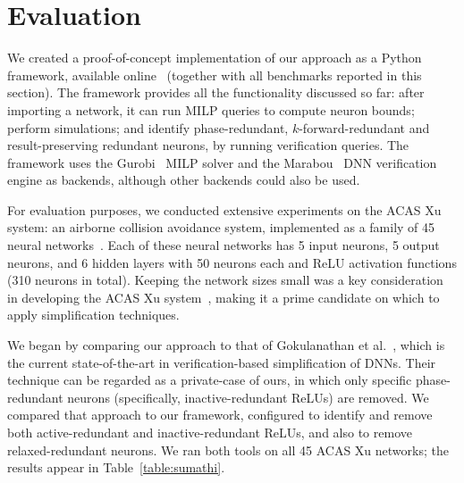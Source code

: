 \documentclass[10pt, conference, twocolumn, compsocconf]{IEEEtran}
\theoremstyle{remark}
\newcommand{\kfr}{$k$-forward-redundant}
\newcommand{\todo}[1]{{\color{red}{\textbf{[TODO]} #1}}}
\newcommand{\guy}[1]{\marginpar{\textcolor{orange}{Guy: #1}}}
\begin{document}







\section{Evaluation}
\label{sec:evaluation}
We created a proof-of-concept implementation of our approach as a
Python framework, available online~\cite{ourCode} (together with all
benchmarks reported in this section). The framework provides all the
functionality discussed so far: after importing a network, it can run
MILP queries to compute neuron bounds; perform simulations; and
identify phase-redundant, \kfr{} and result-preserving redundant
neurons, by running verification queries. The framework uses
the Gurobi~\cite{Gurobi} MILP solver and the Marabou~\cite{Marabou2019} DNN
verification engine as backends, although other backends could also be
used.

For evaluation purposes, we conducted extensive experiments on the
ACAS Xu system: an airborne collision avoidance system, implemented as
a family of 45 neural networks~\cite{JuLoBrOwKo16}. Each of these
neural networks has 5 input neurons, 5 output neurons, and 6 hidden
layers with 50 neurons each and ReLU activation functions (310 neurons
in total). Keeping the network sizes small was a key consideration in
developing the ACAS Xu system~\cite{JuLoBrOwKo16}, making it a prime
candidate on which to apply simplification techniques.

We began by comparing our approach to that of
Gokulanathan et al.~\cite{GoFeMaBaKa20}, which is the current
state-of-the-art in verification-based simplification of DNNs. Their
technique can be regarded as a private-case of ours, in which only
specific phase-redundant neurons (specifically, inactive-redundant
ReLUs) are removed. We compared that approach to our framework,
configured to identify and remove both active-redundant and
inactive-redundant ReLUs, and also to remove relaxed-redundant neurons.
We ran both tools on all 45 ACAS Xu networks; the
results appear in Table~\ref{table:sumathi}.
\end{document}
